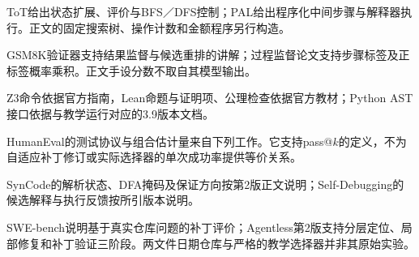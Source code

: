 \begin{fullwidth}
ToT给出状态扩展、评价与BFS／DFS控制；PAL给出程序化中间步骤与解释器执行。正文的固定搜索树、操作计数和金额程序另行构造。
\par{}
\par{}
\end{fullwidth}

\begin{fullwidth}
GSM8K验证器支持结果监督与候选重排的讲解；过程监督论文支持步骤标签及正标签概率乘积。正文手设分数不取自其模型输出。
\par{}
\par{}
\end{fullwidth}

\begin{fullwidth}
Z3命令依据官方指南，Lean命题与证明项、公理检查依据官方教材；Python AST接口依据与教学运行对应的3.9版本文档。
\par{}
\par{}
\par{}
\end{fullwidth}

\begin{fullwidth}
HumanEval的测试协议与组合估计量来自下列工作。它支持pass@$k$的定义，不为自适应补丁修订或实际选择器的单次成功率提供等价关系。
\par{}
\end{fullwidth}

\begin{fullwidth}
\raggedright
SynCode的解析状态、DFA掩码及保证方向按第2版正文说明；Self-Debugging的候选解释与执行反馈按所引版本说明。
\par{}
\par{}
\end{fullwidth}

\begin{fullwidth}
SWE-bench说明基于真实仓库问题的补丁评价；Agentless第2版支持分层定位、局部修复和补丁验证三阶段。两文件日期仓库与严格的教学选择器并非其原始实验。
\par{}
\par{}
\end{fullwidth}

